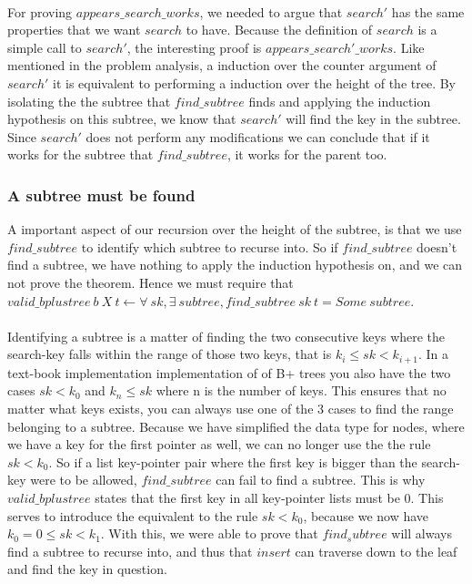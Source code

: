 \paragraph{}
For proving $appears\_search\_works$, we needed to argue that $search'$ has the same properties that we want $search$ to have. Because the definition of $search$ is a simple call to $search'$, the interesting proof is $appears\_search'\_works$. Like mentioned in the problem analysis, a induction over the counter argument of $search'$ it is equivalent to performing a induction over the height of the tree. By isolating the the subtree that $find\_subtree$ finds and applying the induction hypothesis on this subtree, we know that $search'$ will find the key in the subtree. Since $search'$ does not perform any modifications we can conclude that if it works for the subtree that $find\_subtree$, it works for the parent too. 

\subsubsection{A subtree must be found}
A important aspect of our recursion over the height of the subtree, is that we use $find\_subtree$ to identify which subtree to recurse into. So if $find\_subtree$ doesn't find a subtree, we have nothing to apply the induction hypothesis on, and we can not prove the theorem. Hence we must require that
$valid\_bplustree~b~X~t \leftarrow \forall~sk, \exists~subtree, find\_subtree~ sk~t = Some~subtree$.

\paragraph{}
Identifying a subtree is a matter of finding the two consecutive keys where the search-key falls within the range of those two keys, that is $k_i \le sk < k_{i+1}$. In a text-book implementation implementation of of B+ trees you also have the two cases $sk < k_0$ and $k_{n} \le sk$ where n is the number of keys. This ensures that no matter what keys exists, you can always use one of the 3 cases to find the range belonging to a subtree. Because we have simplified the data type for nodes, where we have a key for the first pointer as well, we can no longer use the the rule $sk < k_0$. So if a list key-pointer pair where the first key is bigger than the search-key were to be allowed, $find\_subtree$ can fail to find a subtree. This is why $valid\_bplustree$ states that the first key in all key-pointer lists must be 0. This serves to introduce the equivalent to the rule $sk < k_0$, because we now have $k_0 = 0 \le sk < k_1$. With this, we were able to prove that $find_subtree$ will always find a subtree to recurse into, and thus that $insert$ can traverse down to the leaf and find the key in question.

